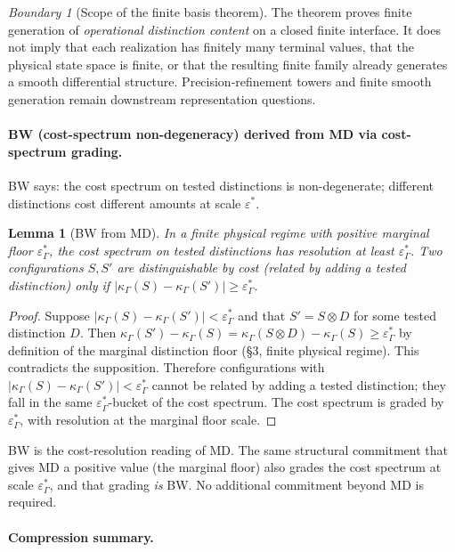 \documentclass[11pt]{article}
\newtheorem{lemma}[theorem]{Lemma}
\theoremstyle{remark}
\newtheorem{warning}[theorem]{Boundary}
\newcommand{\G}{\Gamma}
\newcommand{\Cost}{\kappa}
\newcommand{\floor}{\varepsilon^{\!*}_{\G}}
\newcommand{\eps}{\varepsilon^{\!*}}
\begin{document}
\begin{warning}[Scope of the finite basis theorem]\label{warn:finite-basis-scope}
The theorem proves finite generation of \emph{operational distinction content} on a closed finite interface.  It does not imply that each realization has finitely many terminal values, that the physical state space is finite, or that the resulting finite family already generates a smooth differential structure.  Precision-refinement towers and finite smooth generation remain downstream representation questions.
\end{warning}

\paragraph{BW (cost-spectrum non-degeneracy) derived from MD via cost-spectrum grading.}

BW says: the cost spectrum on tested distinctions is non-degenerate; different distinctions cost different amounts at scale $\eps$.

\begin{lemma}[BW from MD]\label{lem:bw}
In a finite physical regime with positive marginal floor $\floor$, the cost spectrum on tested distinctions has resolution at least $\floor$.  Two configurations $S, S'$ are distinguishable by cost (related by adding a tested distinction) only if $|\Cost_\G(S) - \Cost_\G(S')| \ge \floor$.
\end{lemma}
\begin{proof}
Suppose $|\Cost_\G(S) - \Cost_\G(S')| < \floor$ and that $S' = S \otimes D$ for some tested distinction $D$.  Then $\Cost_\G(S') - \Cost_\G(S) = \Cost_\G(S \otimes D) - \Cost_\G(S) \ge \floor$ by definition of the marginal distinction floor (\S 3, finite physical regime).  This contradicts the supposition.  Therefore configurations with $|\Cost_\G(S) - \Cost_\G(S')| < \floor$ cannot be related by adding a tested distinction; they fall in the same $\floor$-bucket of the cost spectrum.  The cost spectrum is graded by $\floor$, with resolution at the marginal floor scale.
\end{proof}

BW is the cost-resolution reading of MD.  The same structural commitment that gives MD a positive value (the marginal floor) also grades the cost spectrum at scale $\floor$, and that grading \emph{is} BW.  No additional commitment beyond MD is required.

\paragraph{Compression summary.}
\end{document}
